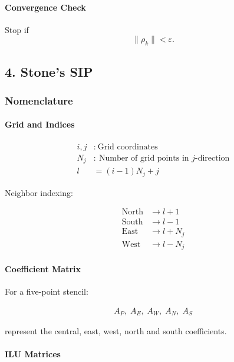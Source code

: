 \documentclass[11pt]{article}
\begin{document}
\paragraph{Convergence Check}
Stop if
\[
\|\rho_k\| < \varepsilon.
\]

\subsection{4. Stone's SIP}

\subsubsection{Nomenclature}

\paragraph{Grid and Indices}

\begin{align*}
i,j &:\ \text{Grid coordinates} \\
N_j &:\ \text{Number of grid points in }j\text{-direction} \\
l &= (i-1)N_j + j
\end{align*}

Neighbor indexing:

\begin{align*}
\text{North} &\rightarrow l+1 \\
\text{South} &\rightarrow l-1 \\
\text{East} &\rightarrow l+N_j \\
\text{West} &\rightarrow l-N_j
\end{align*}

\paragraph{Coefficient Matrix}

For a five-point stencil:

\begin{align*}
A_P,\;A_E,\;A_W,\;A_N,\;A_S
\end{align*}

represent the central, east, west, north and south coefficients.

\paragraph{ILU Matrices}
\end{document}
